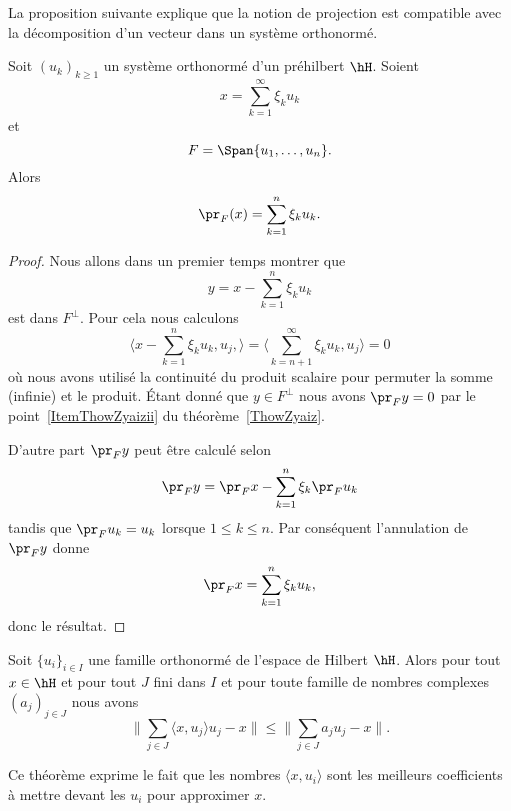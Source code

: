 La proposition suivante explique que la notion de projection est compatible avec la décomposition d'un vecteur dans un système orthonormé.
\begin{proposition}
	Soit \( (u_k)_{k\geq 1}\) un système orthonormé d'un préhilbert \( \hH\). Soient
	\begin{equation}
		x=\sum_{k=1}^{\infty}\xi_ku_k
	\end{equation}
	et
	\begin{equation}
		F=\Span\{ u_1,\ldots, u_n \}.
	\end{equation}
	Alors
	\begin{equation}
		\pr_F(x)=\sum_{k=1}^n\xi_ku_k.
	\end{equation}
\end{proposition}

\begin{proof}
	Nous allons dans un premier temps montrer que
	\begin{equation}
		y=x-\sum_{k=1}^n\xi_ku_k
	\end{equation}
	est dans \( F^{\perp}\). Pour cela nous calculons
	\begin{equation}
		\langle x-\sum_{k=1}^n\xi_ku_k,u_j, \rangle =\langle \sum_{k=n+1}^{\infty}\xi_ku_k, u_j\rangle =0
	\end{equation}
	où nous avons utilisé la continuité du produit scalaire pour permuter la somme (infinie) et le produit. Étant donné que \( y\in F^{\perp}\) nous avons \( \pr_Fy=0\) par le point~\ref{ItemThowZyaizii} du théorème~\ref{ThowZyaiz}.

	D'autre part \( \pr_Fy\) peut être calculé selon
	\begin{equation}
		\pr_Fy=\pr_Fx-\sum_{k=1}^n\xi_k\pr_Fu_k
	\end{equation}
	tandis que \( \pr_Fu_k=u_k\) lorsque \( 1\leq k\leq n\). Par conséquent l'annulation de \( \pr_Fy\) donne
	\begin{equation}
		\pr_Fx=\sum_{k=1}^n\xi_ku_k,
	\end{equation}
	donc le résultat.
\end{proof}

\begin{theorem} \label{ThooRArDp}
	Soit \( \{ u_i \}_{i\in I}\) une famille orthonormé de l'espace de Hilbert \( \hH\). Alors pour tout \( x\in \hH\) et pour tout \( J\) fini dans \( I\) et pour toute famille de nombres complexes  \( (a_j)_{j\in J}\) nous avons
	\begin{equation}
		\| \sum_{j\in J}\langle x, u_j\rangle u_j-x \|\leq \| \sum_{j\in J}a_ju_j-x \|.
	\end{equation}
\end{theorem}
Ce théorème exprime le fait que les nombres \( \langle x, u_i\rangle \) sont les meilleurs coefficients à mettre devant les \( u_i\) pour approximer \( x\).

